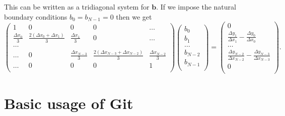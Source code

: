\documentclass{article}
\begin{document}
This can be written as a tridiagonal system for $\bm b$. If we impose the natural boundary conditions $b_0 = b_{N-1} = 0$ then we get
\begin{equation}
  \begin{pmatrix}
    1 & 0 & 0 & 0 & \ldots \\
    \frac{\Delta x_0}{3} & \frac{2(\Delta x_0 + \Delta x_1)}{3} & \frac{\Delta x_1}{3} & 0 & \ldots \\
    \ldots \\
    \ldots & 0 & \frac{\Delta x_{N-3}}{3} & \frac{2(\Delta x_{N-3} + \Delta x_{N-2})}{3} & \frac{\Delta x_{N-2}}{3} \\
    \ldots & 0 & 0 & 0 & 1 \\
  \end{pmatrix}
  \begin{pmatrix}
    b_0 \\
    b_1 \\
    \ldots \\
    b_{N-2} \\
    b_{N-1} \\
  \end{pmatrix}
  =
  \begin{pmatrix}
    0 \\
    \frac{\Delta y_1}{\Delta x_1} - \frac{\Delta y_0}{\Delta x_0} \\
    \ldots \\
    \frac{\Delta y_{N-2}}{\Delta x_{N-2}} - \frac{\Delta y_{N-3}}{\Delta x_{N-3}} \\
    0 \\
  \end{pmatrix}.
\end{equation}

\appendix

\section{\label{app:git}Basic usage of Git}
\end{document}
